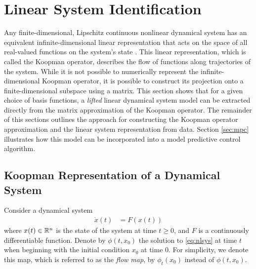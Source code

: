 \section{Linear System Identification}
\label{sec:sysid}

Any finite-dimensional, Lipschitz continuous nonlinear dynamical system has an equivalent infinite-dimensional linear representation that acts on the space of all real-valued functions on the system's state \cite[Definition 3.3.1]{lasota2013chaos}.
This linear representation, which is called the Koopman operator, describes the flow of functions along trajectories of the system.
While it is not possible to numerically represent the infinite-dimensional Koopman operator, it is possible to construct its projection onto a finite-dimensional subspace using a matrix.
This section shows that for a given choice of basis functions, a \emph{lifted} linear dynamical system model can be extracted directly from the matrix approximation of the Koopman operator.
The remainder of this sections outlines the approach for constructing the Koopman operator approximation and the linear system representation from data.
Section \ref{sec:mpc} illustrates how this model can be incorporated into a model predictive control algorithm.

\subsection{Koopman Representation of a Dynamical System}

Consider a dynamical system
\begin{align}
    \dot{x}(t) &= F (x(t))
    \label{eq:nlsys}
\end{align}
where $x(t) \in \mathbb{R}^n$ is the state of the system at time $t \geq 0$, and ${F}$ is a continuously differentiable function.
Denote by $\phi(t,x_0)$ the solution to \eqref{eq:nlsys} at time $t$ when beginning with the initial condition $x_0$ at time $0$.
For simplicity, we denote this map, which is referred to as the \emph{flow map}, by $\phi_t (x_0)$ instead of $\phi (t, x_0)$.

